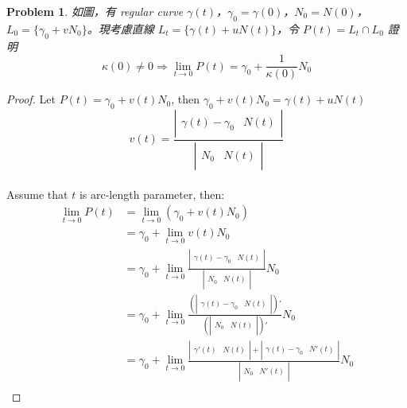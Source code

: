 \documentclass[10pt,a4paper]{article}
\newcounter{theProblemCounter}
\newtheorem{problem}[theProblemCounter]{Problem}
\begin{document}
\setcounter{theProblemCounter}{8}
\begin{problem}
如圖，有 regular curve $\gamma(t)$，$\gamma_0=\gamma(0)$，$N_0=N(0)$，$L_0=\{\gamma_0+vN_0\}$。現考慮直線 $L_t=\{\gamma(t)+uN(t)\}$，令 $P(t)=L_t\cap L_0$ 證明
\[\kappa(0)\ne 0\Rightarrow \lim_{t\to 0}P(t)=\gamma_0 + \frac{1}{\kappa(0)}N_0\]
\end{problem}
\begin{proof}
Let $P(t)=\gamma_0 + v(t)N_0$, then $\gamma_0+v(t)N_0=\gamma(t)+uN(t)$\\
\[v(t)=\frac{\left|\begin{array}{cc}\ &\ \\ \gamma(t)-\gamma_0&N(t)\\\ &\ \end{array}\right|}{\left|\begin{array}{cc}\ &\ \\ N_0& N(t)\\\ &\ \end{array}\right|}\]\\
Assume that $t$ is arc-length parameter, then:\\
\begin{align}
\lim_{t\to 0} P(t) &= \lim_{t\to 0}\left(\gamma_0 + v(t)N_0\right)\\
&= \gamma_0 + \lim_{t\to 0}v(t)N_0\\
&= \gamma_0 + \lim_{t\to 0}\frac{\left|\begin{array}{cc}\ &\ \\ \gamma(t)-\gamma_0&N(t)\\\ &\ \end{array}\right|}{\left|\begin{array}{cc}\ &\ \\ N_0& N(t)\\\ &\ \end{array}\right|} N_0\\
&= \gamma_0 + \lim_{t\to 0}\frac{\left(\left|\begin{array}{cc}\ &\ \\ \gamma(t)-\gamma_0&N(t)\\\ &\ \end{array}\right|\right)'}{\left(\left|\begin{array}{cc}\ &\ \\ N_0& N(t)\\\ &\ \end{array}\right|\right)'} N_0\\
&= \gamma_0 + \lim_{t\to 0}\frac{\left|\begin{array}{cc}\ &\ \\ \gamma'(t)&N(t)\\\ &\ \end{array}\right|+\left|\begin{array}{cc}\ &\ \\ \gamma(t)-\gamma_0&N'(t)\\\ &\ \end{array}\right|}{\left|\begin{array}{cc}\ &\ \\ N_0& N'(t)\\\ &\ \end{array}\right|} N_0\\

\end{align}
\end{proof}
\end{document}
